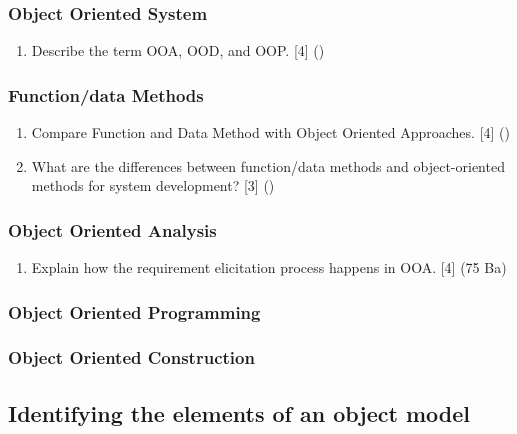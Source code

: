 \documentclass[12pt]{article}
\begin{document}
    \subsubsection{Object Oriented System}
      \begin{enumerate}
        \item Describe the term OOA, OOD, and OOP. \hfill [4] ()
      \end{enumerate}


    \subsubsection{Function/data Methods}
      \begin{enumerate}
        \item Compare Function and Data Method with Object Oriented Approaches. \hfill [4] ()

        \item What are the differences between function/data methods and object-oriented methods for system development? \hfill [3] ()
      \end{enumerate}
    
    \subsubsection{Object Oriented Analysis}
      \begin{enumerate}
        \item Explain how the requirement elicitation process happens in OOA. \hfill [4] (75 Ba)
      \end{enumerate}

    \subsubsection{Object Oriented Programming}

    \subsubsection{Object Oriented Construction}

  \subsection{Identifying the elements of an object model}
\end{document}
